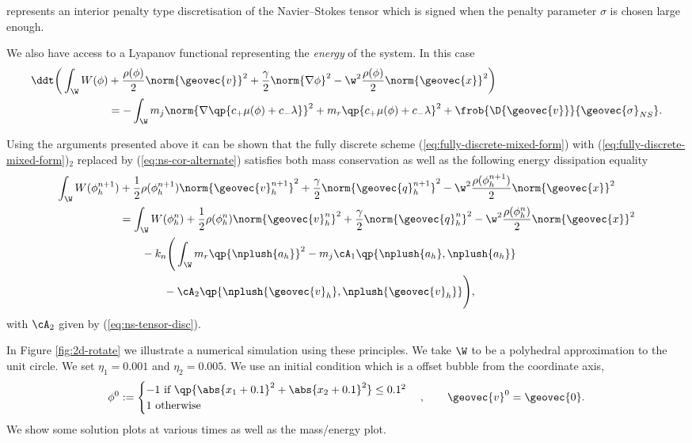 \documentclass[final]{amsart}
\numberwithin{equation}{section}
\begin{document}
represents an interior penalty type discretisation of the
Navier--Stokes tensor which is signed when the penalty parameter
$\sigma$ is chosen large enough.

We also have access to a Lyapanov functional representing the
\emph{energy} of the system. In this case
\begin{equation}
  \begin{split}
    \ddt \bigg( \int_\W W(\phi) &+ \frac{\rho(\phi)}{2} \norm{{\geovec{v}}}^2 +
    \frac{\gamma}{2} \norm{\nabla \phi}^2 - \w^2 \frac{\rho(\phi)}{2}
      \norm{{\geovec{x}}}^2 \bigg)
      \\  &  = - \int_\W m_j  \norm{\nabla \qp{c_+
        \mu(\phi) + c_- \lambda}}^2
    + m_r \qp{ c_+ \mu(\phi) + c_- \lambda }^2 + \frob{\D{\geovec{v}}}{{\geovec{\sigma}}_{NS}}.
  \end{split}
\end{equation}

Using the arguments presented above it can be shown that the fully
discrete scheme (\ref{eq:fully-discrete-mixed-form}) with
(\ref{eq:fully-discrete-mixed-form})$_2$ replaced by
(\ref{eq:ns-cor-alternate}) satisfies both mass conservation as well
as the following energy dissipation equality
\begin{equation}
  \begin{split}
    \int_\W 
    W(\phi_h^{n+1}) 
    &+
    \frac{1}{2} \rho(\phi_h^{n+1})\norm{{\geovec{v}}_h^{n+1}}^2
    +
    \frac{\gamma}{2} \norm{{\geovec{q}}_h^{n+1}}^2
    - \w^2 \frac{\rho(\phi_h^{n+1})}{2}
    \norm{{\geovec{x}}}^2 
    \\
    &=
      \int_\W 
      W(\phi_h^{n}) 
      +
      \frac{1}{2} \rho(\phi_h^{n})\norm{{\geovec{v}}_h^{n}}^2
      +
      \frac{\gamma}{2} \norm{{\geovec{q}}_h^{n}}^2
      - \w^2 \frac{\rho(\phi_h^{n})}{2} \norm{{\geovec{x}}}^2 
      \\
      &\qquad -
      k_n 
      \Bigg(\int_\W m_r \qp{\nplush{a_h}}^2
      -
      m_j \cA_1\qp{\nplush{a_h}, \nplush{a_h}} 
      \\
      &\qquad\qquad -
      \cA_2\qp{\nplush{{\geovec{v}}_h}, \nplush{{\geovec{v}}_h}}
      \Bigg),
    \end{split}
  \end{equation}
  with $\cA_2$ given by (\ref{eq:ns-tensor-disc}).

  In Figure \ref{fig:2d-rotate} we illustrate a numerical simulation
  using these principles. We take $\W$ to be a polyhedral
  approximation to the unit circle. We set $\eta_1 = 0.001$ and
  $\eta_2 = 0.005$. We use an initial condition which is a offset
  bubble from the coordinate axis, \ie
\begin{equation}
  \label{eq:rot-ics}
  \phi^0 :=
  \begin{cases}
    -1 \text{ if } \qp{\abs{x_1 + 0.1}^2 + \abs{x_2 + 0.1}^2} \leq 0.1^2
    \\
    1 \text{ otherwise}
  \end{cases},
  \qquad {\geovec{v}}^0 = {\geovec{0}}.
\end{equation}
We show some solution plots at various times as well as the mass/energy
plot.
\end{document}
